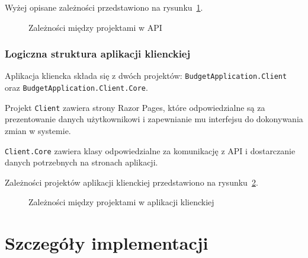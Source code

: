Wyżej opisane zależności przedstawiono na rysunku~\ref{fig:api-arch}. 

\begin{figure}[t]
	\centering
	\caption{Zależności między projektami w API}
	\label{fig:api-arch}
\end{figure}

\subsubsection{Logiczna struktura aplikacji klienckiej}

Aplikacja kliencka składa się z dwóch projektów: \texttt{BudgetApplication.Client} oraz \texttt{BudgetApplication.Client.Core}. 

Projekt \texttt{Client} zawiera strony Razor Pages, które odpowiedzialne są za prezentowanie danych użytkownikowi i zapewnianie mu interfejsu do dokonywania zmian w systemie.

\texttt{Client.Core} zawiera klasy odpowiedzialne za komunikację z API i dostarczanie danych potrzebnych na stronach aplikacji.

Zależności projektów aplikacji klienckiej przedstawiono na rysunku~\ref{fig:client-arch}.

\begin{figure}[t]
	\centering
	\caption{Zależności między projektami w aplikacji klienckiej}
	\label{fig:client-arch}
\end{figure}

\section{Szczegóły implementacji}
\label{sec:szczegoly-implementacji}



